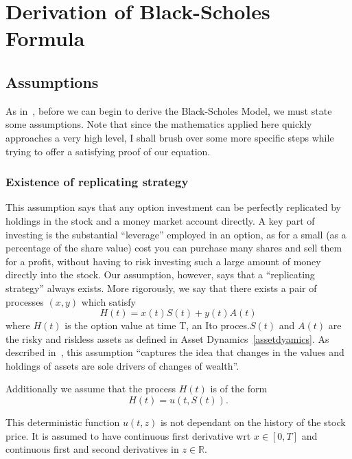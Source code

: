 \documentclass[11pt]{article} %
\begin{document}
\section{Derivation of Black-Scholes Formula}\label{blackScholesAppendix}
\subsection{Assumptions}

As in~\cite{blackscholes}, before we can begin to derive the Black-Scholes Model, we must 
state some assumptions. Note that since the mathematics applied here quickly approaches a 
very high level, I shall brush over some more specific steps while trying to offer a 
satisfying proof of our equation.
\subsubsection{Existence of replicating strategy}\label{replicatingstrategy}

This assumption says that any option investment can be perfectly replicated by holdings in 
the stock and a money market account directly. A key part of investing is the substantial 
``leverage'' employed in an option, as for a small (as a percentage of the share value) cost 
you can purchase many shares and sell them for a profit, without having to risk 
investing such a large amount of money directly into the stock. Our assumption, however, says 
that a ``replicating strategy'' always exists. More rigorously, we say that there exists a 
pair of processes $(x,y)$ which satisfy 
\begin{equation}
    H(t) = x(t)S(t) + y(t)A(t)
\end{equation}
where $H(t)$ is the option value at time T, an Ito proces.$S(t)$ and $A(t)$ are the risky 
and riskless assets as defined in Asset Dynamics~\ref{assetdyamics}. 
As described in~\cite{blackscholes}, this assumption ``captures the idea that changes in the 
values and holdings of assets are sole drivers of changes of wealth''.

Additionally we assume that the process $H(t)$ is of  the form 
\begin{equation}
    H(t) = u(t, S(t)).
\end{equation}

This deterministic function $u(t,z)$ is not dependant on the history of the stock price. 
It is assumed to have continuous first derivative wrt $x \in [0,T]$ and continuous first 
and second derivatives in $z \in \mathbb{R}$.
\end{document}
